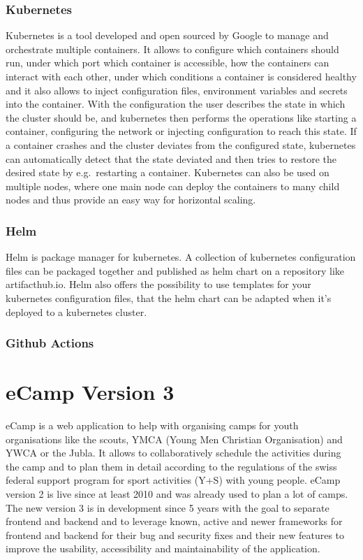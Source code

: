 \documentclass[conference]{IEEEtran}
\begin{document}
\subsubsection{Kubernetes}

Kubernetes is a tool developed and open sourced by Google to manage and orchestrate multiple containers.
It allows to configure which containers should run, under which port which container is accessible,
how the containers can interact with each other, under which conditions a container is considered healthy and it also allows
to inject configuration files, environment variables and secrets into the container.
With the configuration the user describes the state in which the cluster should be, and kubernetes then performs the
operations like starting a container, configuring the network or injecting configuration to reach this state.
If a container crashes and the cluster deviates from the configured state, kubernetes can automatically detect that
the state deviated and then tries to restore the desired state by e.g.\ restarting a container.
Kubernetes can also be used on multiple nodes, where one main node can deploy the containers to many child nodes
and thus provide an easy way for horizontal scaling.

\subsubsection{Helm}

Helm is package manager for kubernetes\cite{artifacthub-io}.
A collection of kubernetes configuration files can be packaged together and published as helm chart on a repository
like artifacthub.io\cite{artifacthub-io}.
Helm also offers the possibility to use templates for your kubernetes configuration files, that the helm chart
can be adapted when it's deployed to a kubernetes cluster.

\subsubsection{Github Actions}

\section{eCamp Version 3}

eCamp is a web application to help with organising camps for youth organisations like the
scouts, YMCA (Young Men Christian Organisation)\cite{ymca-website} and YWCA or the Jubla.
It allows to collaboratively schedule the activities during the camp and to plan them in detail
according to the regulations of the swiss federal support program for sport activities (Y+S) with young people\cite{J+S-Website,ecamp3-website}.
eCamp version 2 is live since at least 2010\cite{ecamp2-first-commit} and was already used to plan a lot of camps.
The new version 3 is in development since 5 years\cite{ecamp3-website} with the goal to separate frontend and backend and
to leverage known, active and newer frameworks for frontend and backend for their bug and security fixes and
their new features to improve the usability, accessibility and maintainability of the application.
\end{document}
